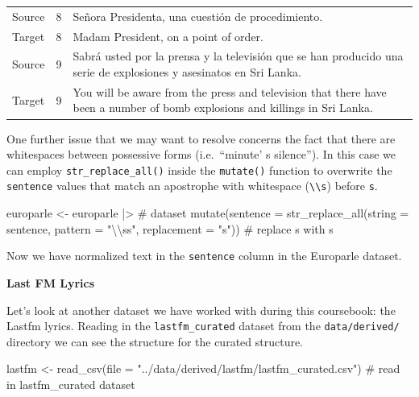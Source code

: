 \documentclass[
  letterpaper,
]{latex/krantz}
\newenvironment{Shaded}{\begin{snugshade}}{\end{snugshade}}
\newcommand{\AttributeTok}[1]{\textcolor[rgb]{0.40,0.45,0.13}{#1}}
\newcommand{\CommentTok}[1]{\textcolor[rgb]{0.37,0.37,0.37}{#1}}
\newcommand{\FunctionTok}[1]{\textcolor[rgb]{0.28,0.35,0.67}{#1}}
\newcommand{\NormalTok}[1]{\textcolor[rgb]{0.00,0.23,0.31}{#1}}
\newcommand{\OtherTok}[1]{\textcolor[rgb]{0.00,0.23,0.31}{#1}}
\newcommand{\SpecialCharTok}[1]{\textcolor[rgb]{0.37,0.37,0.37}{#1}}
\newcommand{\StringTok}[1]{\textcolor[rgb]{0.13,0.47,0.30}{#1}}
\begin{document}
\begin{table}
\begin{tabular}{lrl}
\addlinespace
Source & 8 & Señora Presidenta, una cuestión de procedimiento.\\
Target & 8 & Madam President, on a point of order.\\
Source & 9 & Sabrá usted por la prensa y la televisión que se han producido una serie de explosiones y asesinatos en Sri Lanka.\\
Target & 9 & You will be aware from the press and television that there have been a number of bomb explosions and killings in Sri Lanka.\\
\bottomrule
\end{tabular}
\end{table}

One further issue that we may want to resolve concerns the fact that
there are whitespaces between possessive forms (i.e.~``minute' s
silence''). In this case we can employ \texttt{str\_replace\_all()}
inside the \texttt{mutate()} function to overwrite the \texttt{sentence}
values that match an apostrophe \texttt{\textquotesingle{}} with
whitespace (\texttt{\textbackslash{}\textbackslash{}s}) before
\texttt{s}.

\begin{Shaded}
\begin{Highlighting}[]
\NormalTok{europarle }\OtherTok{\textless{}{-}} 
\NormalTok{  europarle }\SpecialCharTok{|\textgreater{}} \CommentTok{\# dataset}
  \FunctionTok{mutate}\NormalTok{(}\AttributeTok{sentence =} \FunctionTok{str\_replace\_all}\NormalTok{(}\AttributeTok{string =}\NormalTok{ sentence, }
                                    \AttributeTok{pattern =} \StringTok{"\textquotesingle{}}\SpecialCharTok{\textbackslash{}\textbackslash{}}\StringTok{ss"}\NormalTok{, }
                                    \AttributeTok{replacement =} \StringTok{"\textquotesingle{}s"}\NormalTok{)) }\CommentTok{\# replace \textquotesingle{} s with \textasciigrave{}s}
\end{Highlighting}
\end{Shaded}

Now we have normalized text in the \texttt{sentence} column in the
Europarle dataset.

\textbf{Last FM Lyrics}

Let's look at another dataset we have worked with during this
coursebook: the Lastfm lyrics. Reading in the \texttt{lastfm\_curated}
dataset from the \texttt{data/derived/} directory we can see the
structure for the curated structure.

\begin{Shaded}
\begin{Highlighting}[]
\NormalTok{lastfm }\OtherTok{\textless{}{-}} \FunctionTok{read\_csv}\NormalTok{(}\AttributeTok{file =} \StringTok{"../data/derived/lastfm/lastfm\_curated.csv"}\NormalTok{) }\CommentTok{\# read in lastfm\_curated dataset}
\end{Highlighting}
\end{Shaded}
\end{document}
